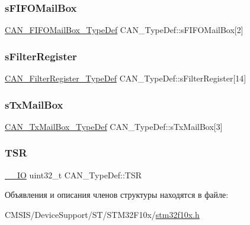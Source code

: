 \subsubsection{\texorpdfstring{sFIFOMailBox}{sFIFOMailBox}}
{\footnotesize\ttfamily \mbox{\hyperlink{struct_c_a_n___f_i_f_o_mail_box___type_def}{C\+A\+N\+\_\+\+F\+I\+F\+O\+Mail\+Box\+\_\+\+Type\+Def}} C\+A\+N\+\_\+\+Type\+Def\+::s\+F\+I\+F\+O\+Mail\+Box\mbox{[}2\mbox{]}}

\mbox{\label{struct_c_a_n___type_def_ab8ad52d839d4bcea4ce3502a4d279ff1}} 
\subsubsection{\texorpdfstring{sFilterRegister}{sFilterRegister}}
{\footnotesize\ttfamily \mbox{\hyperlink{struct_c_a_n___filter_register___type_def}{C\+A\+N\+\_\+\+Filter\+Register\+\_\+\+Type\+Def}} C\+A\+N\+\_\+\+Type\+Def\+::s\+Filter\+Register\mbox{[}14\mbox{]}}

\mbox{\label{struct_c_a_n___type_def_a328925e230f68a775f6f4ad1076c27ce}} 
\subsubsection{\texorpdfstring{sTxMailBox}{sTxMailBox}}
{\footnotesize\ttfamily \mbox{\hyperlink{struct_c_a_n___tx_mail_box___type_def}{C\+A\+N\+\_\+\+Tx\+Mail\+Box\+\_\+\+Type\+Def}} C\+A\+N\+\_\+\+Type\+Def\+::s\+Tx\+Mail\+Box\mbox{[}3\mbox{]}}

\mbox{\label{struct_c_a_n___type_def_acbc82ac4e87e75350fc586be5e56d95b}} 
\subsubsection{\texorpdfstring{TSR}{TSR}}
{\footnotesize\ttfamily \mbox{\hyperlink{group___c_m_s_i_s___c_m3__core__definitions_gaec43007d9998a0a0e01faede4133d6be}{\+\_\+\+\_\+\+IO}} uint32\+\_\+t C\+A\+N\+\_\+\+Type\+Def\+::\+T\+SR}



Объявления и описания членов структуры находятся в файле\+:\begin{DoxyCompactItemize}
\item 
C\+M\+S\+I\+S/\+Device\+Support/\+S\+T/\+S\+T\+M32\+F10x/\mbox{\hyperlink{stm32f10x_8h}{stm32f10x.\+h}}\end{DoxyCompactItemize}
